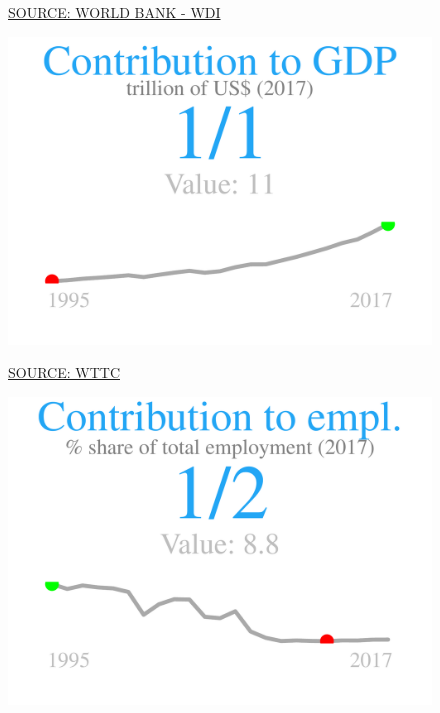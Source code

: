 \documentclass{article}\usepackage[]{graphicx}\usepackage[]{color}
\makeatletter
\def\maxwidth{ %
  \ifdim\Gin@nat@width>\linewidth
    \linewidth
  \else
    \Gin@nat@width
  \fi
}
\makeatother
\begin{document}
\begin{figure}
\begin{minipage}[t]{0.99\textwidth}
\begin{minipage}[t]{0.56\textwidth}
\begin{minipage}[c]{0.30\textwidth}
    \vspace{-2ex}
    \hspace{2ex}\tiny{\href{http://data.worldbank.org/data-catalog/world-development-indicators}{\textcolor[HTML]{FF4023}{SOURCE: WORLD BANK - WDI}}}
    \vspace{3ex}
    \end{minipage}
    \begin{minipage}[c]{0.30\textwidth}


{\centering \includegraphics[width=\maxwidth]{figure/figure_sparkline3-1} 

}



    \vspace{-2ex}
    \hspace{2ex}\tiny{\href{https://tool.wttc.org/}{\textcolor[HTML]{FF4023}{SOURCE: WTTC}}}
    \vspace{3ex}
    \end{minipage}
    
    \begin{minipage}[c]{0.30\textwidth}


{\centering \includegraphics[width=\maxwidth]{figure/figure_sparkline4-1} 

}
\end{minipage}
\end{minipage}
\end{minipage}
\end{figure}
\end{document}
